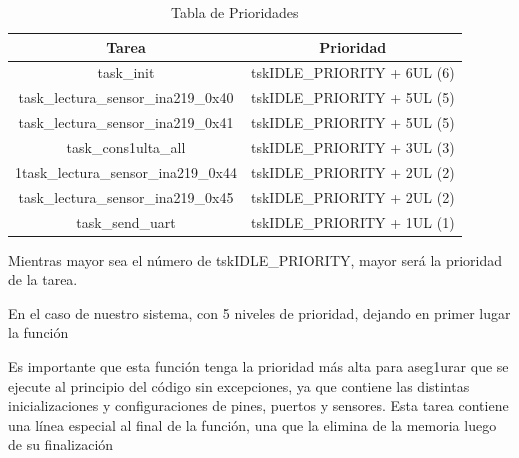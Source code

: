                         \begin{table}[H]
                            \centering
                            \begin{tabular}{|c|c|}
                            \hline
                                Tarea & Prioridad\\
                            \hline
                                task\_init & tskIDLE\_PRIORITY + 6UL (6) \\
                            \hline
                                task\_lectura\_sensor\_ina219\_0x40 & tskIDLE\_PRIORITY + 5UL (5)\\
                            \hline
                                task\_lectura\_sensor\_ina219\_0x41 & tskIDLE\_PRIORITY + 5UL (5)\\
                            \hline
                                task\_cons1ulta\_all & tskIDLE\_PRIORITY + 3UL (3) \\
                            \hline
                                1task\_lectura\_sensor\_ina219\_0x44 & tskIDLE\_PRIORITY + 2UL (2)\\
                            \hline
                                task\_lectura\_sensor\_ina219\_0x45 & tskIDLE\_PRIORITY + 2UL (2)\\
                            \hline
                                task\_send\_uart & tskIDLE\_PRIORITY + 1UL (1)\\
                            \hline
                            \end{tabular}
                            \caption{Tabla de Prioridades}
                            \label{tab:6}
                        \end{table}
                        
                    Mientras mayor sea el número de tskIDLE\_PRIORITY, mayor será la prioridad de la tarea.\par
                    En el caso de nuestro sistema, con 5 niveles de prioridad, dejando en primer lugar la función\par
                    \par
                    
                    Es importante que esta función tenga la prioridad más alta para aseg1urar que se ejecute al principio del código sin excepciones, ya que contiene las distintas inicializaciones y configuraciones de pines, puertos y sensores. Esta tarea contiene una línea especial al final de la función, una que la elimina de la memoria luego de su finalización\par
                    \par
                    
